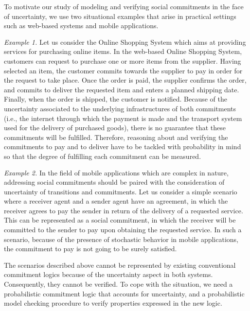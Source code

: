 To motivate our study of modeling and verifying social commitments in the face of uncertainty, we use two situational examples that arise in practical settings such as web-based systems and mobile applications.

\textit{Example 1.} Let us consider the Online Shopping System
\cite{Gomaa2011} which aims at providing services for purchasing
online items. In the web-based Online Shopping System, customers
can request to purchase one or more items from the supplier.
Having selected an item, the customer commits towards the supplier
to pay in order for the request to take place. Once the order is
paid, the supplier confirms the order, and commits to deliver the
requested item and enters a planned shipping date. Finally, when
the order is shipped, the customer is notified. Because of the
uncertainty associated to the underlying infrastructures of both
commitments (i.e., the internet through which the payment is made
and the transport system used for the delivery of purchased
goods), there is no guarantee that these commitments will be
fulfilled. Therefore, reasoning about and verifying the
commitments to pay and to deliver have to be tackled with
probability in mind so that the degree of fulfilling each
commitment can be measured.

\textit{Example 2.} In the field of mobile applications which are
complex in nature, addressing social commitments should be
paired with the consideration of uncertainty of transitions and
commitments. Let us consider a simple scenario where a receiver
agent and a sender agent have an agreement, in which the receiver
agrees to pay the sender in return of the delivery of a requested
service. This can be represented as a social commitment, in which
the receiver will be committed to the sender to pay upon obtaining
the requested service. In such a scenario, because of the presence
of stochastic behavior in mobile applications, the commitment to
pay is not going to be surely satisfied.

The scenarios described above cannot be represented by existing
conventional commitment logics because of the uncertainty aspect
in both systems. Consequently, they cannot be verified. To cope
with the situation, we need a probabilistic commitment logic that
accounts for uncertainty, and a probabilistic model
checking procedure to verify properties expressed in the new logic.


